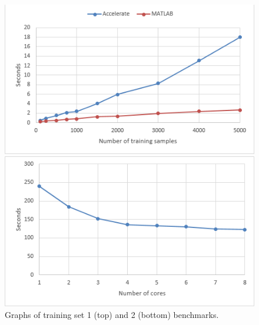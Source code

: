 \begin{figure}
\centerline
	{\includegraphics[scale=0.7]{training1.png}}
\centerline	
	{\includegraphics[scale=0.7]{training2.png}}
	\caption{Graphs of training set 1 (top) and 2 (bottom) benchmarks.}
	\label{fig:traininggraphs}
\end{figure}
